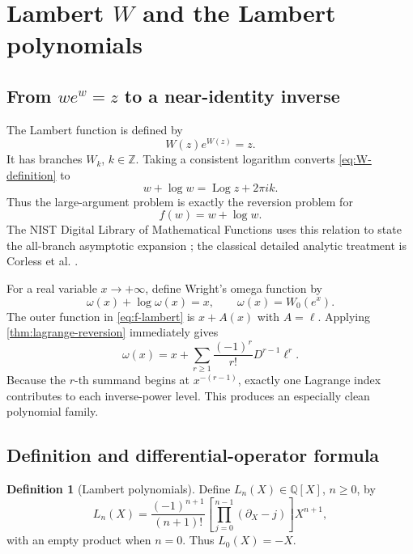 \documentclass[11pt,oneside]{article}
\numberwithin{equation}{section}
\theoremstyle{definition}
\newtheorem{definition}[theorem]{Definition}
\newcommand{\Q}{\mathbb Q}
\newcommand{\Z}{\mathbb Z}
\newcommand{\Log}{\operatorname{Log}}
\begin{document}
\section{Lambert \texorpdfstring{\(W\)}{W} and the Lambert polynomials}\label{sec:lambert}

\subsection{From \(we^w=z\) to a near-identity inverse}

The Lambert function is defined by
\begin{equation}\label{eq:W-definition}
  W(z)e^{W(z)}=z.
\end{equation}
It has branches \(W_k\), \(k\in\Z\).  Taking a consistent logarithm converts
\eqref{eq:W-definition} to
\begin{equation}\label{eq:W-log-equation}
  w+\log w=\Log z+2\pi i k.
\end{equation}
Thus the large-argument problem is exactly the reversion problem for
\begin{equation}\label{eq:f-lambert}
  f(w)=w+\log w.
\end{equation}
The NIST Digital Library of Mathematical Functions uses this relation to state
the all-branch asymptotic expansion \cite{DLMFLambert}; the classical detailed
analytic treatment is Corless et al. \cite{Corless1996}.

For a real variable \(x\to+\infty\), define Wright's omega function by
\begin{equation}\label{eq:omega-def}
  \omega(x)+\log\omega(x)=x,
  \qquad \omega(x)=W_0(e^x).
\end{equation}
The outer function in \eqref{eq:f-lambert} is \(x+A(x)\) with \(A=\ell\).
Applying \cref{thm:lagrange-reversion} immediately gives
\begin{equation}\label{eq:omega-lagrange}
  \omega(x)=x+\sum_{r\ge1}\frac{(-1)^r}{r!}
  D^{r-1}\ell^r.
\end{equation}
Because the \(r\)-th summand begins at \(x^{-(r-1)}\), exactly one Lagrange
index contributes to each inverse-power level.  This produces an especially
clean polynomial family.

\subsection{Definition and differential-operator formula}

\begin{definition}[Lambert polynomials]
Define \(L_n(X)\in\Q[X]\), \(n\ge0\), by
\begin{equation}\label{eq:Lambert-polynomial-operator}
\boxed{
  L_n(X)=\frac{(-1)^{n+1}}{(n+1)!}
  \left[\prod_{j=0}^{n-1}(\partial_X-j)\right]X^{n+1},
}
\end{equation}
with an empty product when \(n=0\).  Thus \(L_0(X)=-X\).
\end{definition}
\end{document}
